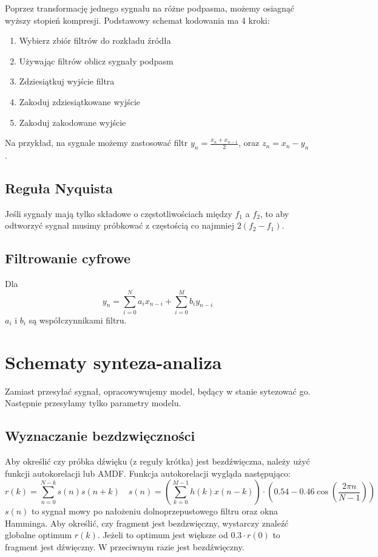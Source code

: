 \documentclass{../notatki}
\begin{document}
Poprzez transformację jednego sygnału na różne podpasma, możemy
osiagnąć wyższy stopień kompresji. Podstawowy schemat kodowania ma 4 kroki:
\begin{enumerate}
  \item Wybierz zbiór filtrów do rozkładu źródła
  \item Używając filtrów oblicz sygnały podpasm
  \item Zdziesiątkuj wyjście filtra
  \item Zakoduj zdziesiątkowane wyjście
  \item Zakoduj zakodowane wyjście
\end{enumerate}

Na przykład, na sygnale możemy zastosować filtr $y_n = \frac{x_n +
x_{n - 1}}{2}$, oraz $z_n = x_n - y_n$.

\subsection{Reguła Nyquista}

Jeśli sygnały mają tylko składowe o częstotliwościach między $f_1$ a $f_2$, to
aby odtworzyć sygnał musimy próbkować z częstością co najmniej $2(f_2 - f_1)$.

\subsection{Filtrowanie cyfrowe}

Dla
$$
y_n =\sum_{i=0}^{N} a_i x_{n-i} + \sum_{i=0}^{M} b_i y_{n-i}
$$
$a_i$ i $b_i$ są współczynnikami filtru.

\section{Schematy synteza-analiza}

Zamiast przesyłać sygnał, opracowywujemy model, będący w stanie sytezować go.
Następnie przesyłamy tylko parametry modelu.

\subsection{Wyznaczanie bezdzwięczności}

Aby określić czy próbka dźwięku (z reguły krótka) jest bezdźwięczna, należy
użyć funkcji autokorelacji lub AMDF. Funkcja autokorelacji wygląda
następująco:
$$
r(k) = \sum_{n=0}^{N-k} s(n)s(n + k) \quad s(n) = (\sum_{k=0}^{M -
1}h(k)x(n - k)) \cdot (0.54 - 0.46 \cos(\frac{2\pi n}{N - 1}))
$$
$s(n)$ to sygnał mowy po nałożeniu dolnoprzepustowego filtru oraz okna Hamminga.
Aby określić, czy fragment jest bezdzwięczny, wystarczy znaleźć globalne optimum
$r(k)$. Jeżeli to optimum jest większe od $0.3 \cdot r(0)$ to fragment jest
dźwięczny. W przeciwnym razie jest bezdźwięczny.
\end{document}
